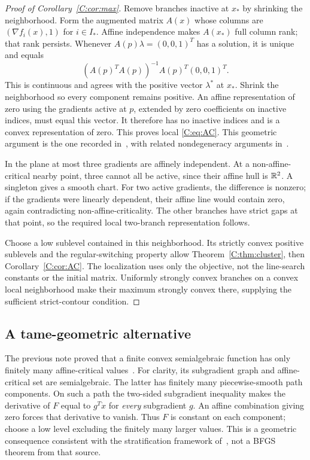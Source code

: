 \documentclass[10pt,oneside,openany]{book}
\theoremstyle{remark}\newtheorem{remark}{Remark}[chapter]
\begin{document}
\begin{proof}[Proof of Corollary~\ref{C:cor:max}]
Remove branches inactive at $x_*$ by shrinking the neighborhood. Form the augmented matrix $A(x)$ whose columns are $(\nabla f_i(x),1)$ for $i\in I_*$. Affine independence makes $A(x_*)$ full column rank; that rank persists. Whenever $A(p)\lambda=(0,0,1)^T$ has a solution, it is unique and equals
\[
 (A(p)^TA(p))^{-1}A(p)^T(0,0,1)^T.
\]
This is continuous and agrees with the positive vector $\lambda^*$ at $x_*$. Shrink the neighborhood so every component remains positive. An affine representation of zero using the gradients active at $p$, extended by zero coefficients on inactive indices, must equal this vector. It therefore has no inactive indices and is a convex representation of zero. This proves local \eqref{C:eq:AC}. This geometric argument is the one recorded in~\cite{SA}, with related nondegeneracy arguments in~\cite{BG}.

In the plane at most three gradients are affinely independent. At a non-affine-critical nearby point, three cannot all be active, since their affine hull is $\mathbb R^2$. A singleton gives a smooth chart. For two active gradients, the difference is nonzero; if the gradients were linearly dependent, their affine line would contain zero, again contradicting non-affine-criticality. The other branches have strict gaps at that point, so the required local two-branch representation follows.

Choose a low sublevel contained in this neighborhood. Its strictly convex positive sublevels and the regular-switching property allow Theorem~\ref{C:thm:cluster}, then Corollary~\ref{C:cor:AC}. The localization uses only the objective, not the line-search constants or the initial matrix. Uniformly strongly convex branches on a convex local neighborhood make their maximum strongly convex there, supplying the sufficient strict-contour condition.
\end{proof}

\subsection{A tame-geometric alternative}
The previous note proved that a finite convex semialgebraic function has only finitely many affine-critical values~\cite{SA}. For clarity, its subgradient graph and affine-critical set are semialgebraic. The latter has finitely many piecewise-smooth path components. On such a path the two-sided subgradient inequality makes the derivative of $F$ equal to $g^T\dot x$ for \emph{every} subgradient $g$. An affine combination giving zero forces that derivative to vanish. Thus $F$ is constant on each component; choose a low level excluding the finitely many larger values. This is a geometric consequence consistent with the stratification framework of~\cite{BDLS}, not a BFGS theorem from that source.
\end{document}
